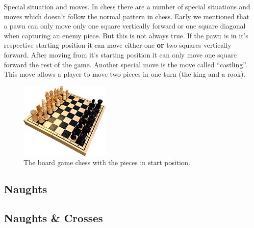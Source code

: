 Special situation and moves. In chess there are a number of special situations and moves which doesn't follow the normal pattern in chess. Early we mentioned that a pawn can only move only one square vertically forward or one square diagonal when capturing an enemy piece. But this is not always true. If the pawn is in it's respective starting position it can move either one \textbf{or} two squares vertically forward. After moving from it's starting position it can only move one square forward the rest of the game. Another special move is the move called ``castling''. This move allows a player to move two pieces in one turn (the king and a rook).   

\begin{figure}
	\centering
		\includegraphics[scale=0.1]{pictures/chess.png}
		\caption{The board game chess with the pieces in start position.}
\label{fig:chess}
\end{figure}

\subsection{Naughts}

\subsection{Naughts \& Crosses}       